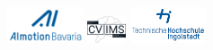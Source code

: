 

\begin{titlepage}	
	\begin{figure}[!h]
		\centering
			\includegraphics[width={0.2\textwidth}]{images/ai-motion.png}	
			\hfill
			\includegraphics[width={0.1\textwidth}]{images/cvims_logo_dark.png}	
			\hfill
			\includegraphics[width={0.2\textwidth}]{images/thiRGB.jpg}	
		\end{figure}																			
	

\end{titlepage}

